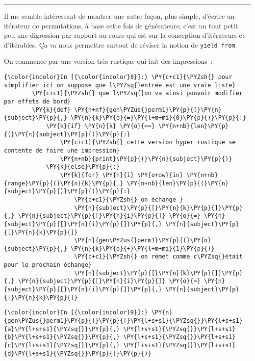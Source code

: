\begin{center}\rule{0.5\linewidth}{\linethickness}\end{center}

    Il me semble intéressant de montrer une autre façon, plus simple,
d'écrire un itérateur de permutations, à base cette fois de générateurs;
c'est un tout petit peu une digression par rapport au cours qui est sur
la conception d'itérateurs et d'itérables. Ça va nous permettre surtout
de réviser la notion de \texttt{yield\ from}.

    On commence par une version très rustique qui fait des impressions~:

    \begin{Verbatim}[commandchars=\\\{\},frame=single,framerule=0.3mm,rulecolor=\color{cellframecolor}]
{\color{incolor}In [{\color{incolor}8}]:} \PY{c+c1}{\PYZsh{} pour simplifier ici on suppose que l\PYZsq{}entrée est une vraie liste}
        \PY{c+c1}{\PYZsh{} que l\PYZsq{}on va ainsi pouvoir modifier par effets de bord}
        \PY{k}{def} \PY{n+nf}{gen\PYZus{}perm1}\PY{p}{(}\PY{n}{subject}\PY{p}{,} \PY{n}{k}\PY{o}{=}\PY{l+m+mi}{0}\PY{p}{)}\PY{p}{:}
            \PY{k}{if} \PY{n}{k} \PY{o}{==} \PY{n+nb}{len}\PY{p}{(}\PY{n}{subject}\PY{p}{)}\PY{p}{:}
                \PY{c+c1}{\PYZsh{} cette version hyper rustique se contente de faire une impression}
                \PY{n+nb}{print}\PY{p}{(}\PY{n}{subject}\PY{p}{)}
            \PY{k}{else}\PY{p}{:}
                \PY{k}{for} \PY{n}{i} \PY{o+ow}{in} \PY{n+nb}{range}\PY{p}{(}\PY{n}{k}\PY{p}{,} \PY{n+nb}{len}\PY{p}{(}\PY{n}{subject}\PY{p}{)}\PY{p}{)}\PY{p}{:}
                    \PY{c+c1}{\PYZsh{} on échange }
                    \PY{n}{subject}\PY{p}{[}\PY{n}{k}\PY{p}{]}\PY{p}{,} \PY{n}{subject}\PY{p}{[}\PY{n}{i}\PY{p}{]} \PY{o}{=} \PY{n}{subject}\PY{p}{[}\PY{n}{i}\PY{p}{]}\PY{p}{,} \PY{n}{subject}\PY{p}{[}\PY{n}{k}\PY{p}{]}
                    \PY{n}{gen\PYZus{}perm1}\PY{p}{(}\PY{n}{subject}\PY{p}{,} \PY{n}{k}\PY{o}{+}\PY{l+m+mi}{1}\PY{p}{)}
                    \PY{c+c1}{\PYZsh{} on remet comme c\PYZsq{}était pour le prochain échange}
                    \PY{n}{subject}\PY{p}{[}\PY{n}{k}\PY{p}{]}\PY{p}{,} \PY{n}{subject}\PY{p}{[}\PY{n}{i}\PY{p}{]} \PY{o}{=} \PY{n}{subject}\PY{p}{[}\PY{n}{i}\PY{p}{]}\PY{p}{,} \PY{n}{subject}\PY{p}{[}\PY{n}{k}\PY{p}{]}
\end{Verbatim}


    \begin{Verbatim}[commandchars=\\\{\},frame=single,framerule=0.3mm,rulecolor=\color{cellframecolor}]
{\color{incolor}In [{\color{incolor}9}]:} \PY{n}{gen\PYZus{}perm1}\PY{p}{(}\PY{p}{[}\PY{l+s+s1}{\PYZsq{}}\PY{l+s+s1}{a}\PY{l+s+s1}{\PYZsq{}}\PY{p}{,} \PY{l+s+s1}{\PYZsq{}}\PY{l+s+s1}{b}\PY{l+s+s1}{\PYZsq{}}\PY{p}{,} \PY{l+s+s1}{\PYZsq{}}\PY{l+s+s1}{c}\PY{l+s+s1}{\PYZsq{}}\PY{p}{,} \PY{l+s+s1}{\PYZsq{}}\PY{l+s+s1}{d}\PY{l+s+s1}{\PYZsq{}}\PY{p}{]}\PY{p}{)}
\end{Verbatim}


